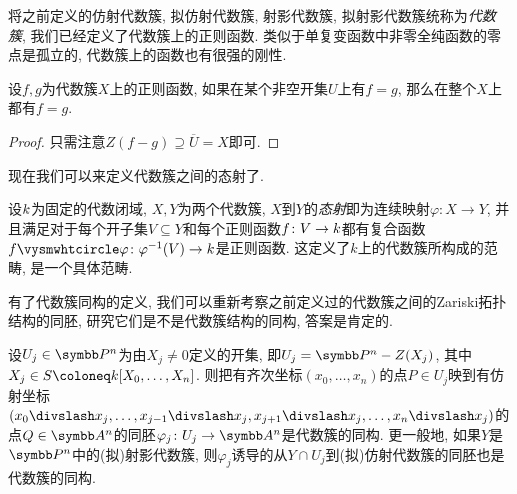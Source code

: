 将之前定义的仿射代数簇, 拟仿射代数簇, 射影代数簇, 拟射影代数簇统称为\emph{代数簇}, 我们已经定义了代数簇上的正则函数. 类似于单复变函数中非零全纯函数的零点是孤立的\parencite[127]{ahlfors_complex_1978}, 代数簇上的函数也有很强的刚性.

\begin{proposition}\label{prop:regularstiffness}
  设$f, g$为代数簇$X$上的正则函数, 如果在某个非空开集$U$上有$f=g$, 那么在整个$X$上都有$f=g$.
\end{proposition}

\begin{proof}
  只需注意$Z(f-g)\supseteq \overline{U}=X$即可.
\end{proof}

现在我们可以来定义代数簇之间的态射了.

\begin{definition}
  设$k$为固定的代数闭域, $X, Y$为两个代数簇, $X$到$Y$的\emph{态射}即为连续映射$\varphi\colon X\to Y$, 并且满足对于每个开子集$V\subseteq Y$和每个正则函数$f\colon V\to k$都有复合函数$f\composite\varphi\colon\varphi^{-1}(V)\to \kk$是正则函数. 这定义了$k$上的代数簇所构成的范畴, 是一个具体范畴.
\end{definition}

有了代数簇同构的定义, 我们可以重新考察之前定义过的代数簇之间的Zariski拓扑结构的同胚, 研究它们是不是代数簇结构的同构, 答案是肯定的.

\begin{proposition}\label{prop:projectiveopencoverisomorphism}
  设$U_j\in \PP^n$为由$X_j\neq 0$定义的开集, 即$U_j=\PP^n - Z(X_j)$, 其中$X_j\in S\coloneq \kk [X_0, \dotsc, X_n]$. 则把有齐次坐标$(x_0, \dotsc, x_n)$的点$P\in U_j$映到有仿射坐标$(x_0{\divslash}x_j,\linebreak[0] \dotsc, x_{j-1}{\divslash}x_j,\linebreak[0] x_{j+1}{\divslash}x_j, \dotsc,  x_n{\divslash}x_j)$的点$Q\in \AF^n$的同胚$\varphi_j\colon U_j\to \AF^n$是代数簇的同构. 更一般地, 如果$Y$是$\PP^n$中的(拟)射影代数簇, 则$\varphi_j$诱导的从$Y\cap U_j$到(拟)仿射代数簇的同胚也是代数簇的同构.
\end{proposition}

